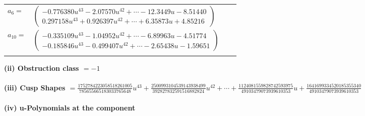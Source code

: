 \documentclass[1p]{elsarticle_modified}
\theoremstyle{definition}
\begin{document}
\begin{tabular}{m{7pt} m{180pt} m{7pt} m{180pt} }
\flushright $a_{6}=$&$\begin{pmatrix}-0.776380 u^{43}-2.07570 u^{42}+\cdots-12.3449 u-8.51440\\0.297158 u^{43}+0.926397 u^{42}+\cdots+6.35873 u+4.85216\end{pmatrix}$ \\
\flushright $a_{10}=$&$\begin{pmatrix}-0.335109 u^{43}-1.04952 u^{42}+\cdots-6.89963 u-4.51774\\-0.185846 u^{43}-0.499407 u^{42}+\cdots-2.65438 u-1.59651\end{pmatrix}$\\&\end{tabular}
\flushleft \textbf{(ii) Obstruction class $= -1$}\\~\\
\flushleft \textbf{(iii) Cusp Shapes $= \frac{1752784223058518261005}{785655665183033765648} u^{43}+\frac{2500993104539143938499}{392827832591516882824} u^{42}+\cdots+\frac{1124081559828742593975}{49103479073939610353} u+\frac{1641699334520185355340}{49103479073939610353}$}\\~\\
\newpage\renewcommand{\arraystretch}{1}
\flushleft \textbf{(iv) u-Polynomials at the component}\newline \\
\end{document}
